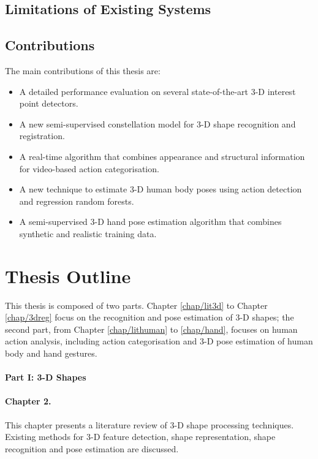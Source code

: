 \subsection{Limitations of Existing Systems}

\subsection{Contributions}

The main contributions of this thesis are:
\begin{itemize}
	\item A detailed performance evaluation on several state-of-the-art 3-D interest point detectors.
	\item A new semi-supervised constellation model for 3-D shape recognition and registration. 
	\item A real-time algorithm that combines appearance and structural information for video-based action categorisation. 
	\item A new technique to estimate 3-D human body poses using action detection and regression random forests. 
	\item A semi-supervised 3-D hand pose estimation algorithm that combines synthetic and realistic training data. 
\end{itemize}

\section{Thesis Outline}

This thesis is composed of two parts. Chapter \ref{chap/lit3d} to Chapter \ref{chap/3dreg} focus on the recognition and pose estimation of 3-D shapes; the second part, from Chapter \ref{chap/lithuman} to \ref{chap/hand}, focuses on human action analysis, including action categorisation and 3-D pose estimation of human body and hand gestures.  

\paragraph{Part I: 3-D Shapes}

\paragraph{Chapter 2.} 
This chapter presents a literature review of 3-D shape processing techniques.  
Existing methods for 3-D feature detection, shape representation, shape recognition and pose estimation are discussed.  

